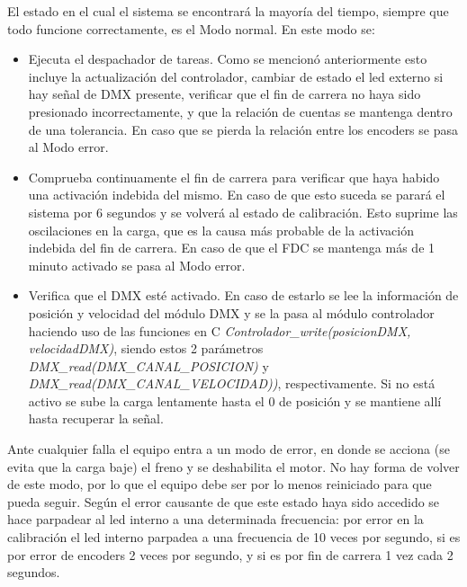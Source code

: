 El estado en el cual el sistema se encontrará la mayoría del tiempo, siempre que todo funcione correctamente, es el Modo normal. En este modo se:
\begin{itemize}
	\item Ejecuta el despachador de tareas. Como se mencionó anteriormente esto incluye la actualización del controlador, cambiar de estado el led externo si hay señal de DMX presente, verificar que el fin de carrera no haya sido presionado incorrectamente, y que la relación de cuentas se mantenga dentro de una tolerancia. En caso que se pierda la relación entre los encoders se pasa al Modo error.
	\item Comprueba continuamente el fin de carrera para verificar que haya habido una activación indebida del mismo. En caso de que esto suceda se parará el sistema por 6 segundos y se volverá al estado de calibración. Esto suprime las oscilaciones en la carga, que es la causa más probable de la activación indebida del fin de carrera. En caso de que el FDC se mantenga más de 1 minuto activado se pasa al Modo error.
	\item Verifica que el DMX esté activado. En caso de estarlo se lee la información de posición y velocidad del módulo DMX y se la pasa al módulo controlador haciendo uso de las funciones en C \textit{ Controlador\_write(posicionDMX, velocidadDMX)}, siendo estos 2 parámetros \textit{DMX\_read(DMX\_CANAL\_POSICION)} y \\ \textit{DMX\_read(DMX\_CANAL\_VELOCIDAD))}, respectivamente. Si no está activo se sube la carga lentamente hasta el 0 de posición y se mantiene allí hasta recuperar la señal.
\end{itemize}

Ante cualquier falla el equipo entra a un modo de error, en donde se acciona (se evita que la carga baje) el freno y se deshabilita el motor. No hay forma de volver de este modo, por lo que el equipo debe ser por lo menos reiniciado para que pueda seguir. Según el error causante de que este estado haya sido accedido se hace parpadear al led interno a una determinada frecuencia: por error en la calibración el led interno parpadea a una frecuencia de 10 veces por segundo, si es por error de encoders 2 veces por segundo, y si es por fin de carrera 1 vez cada 2 segundos.






